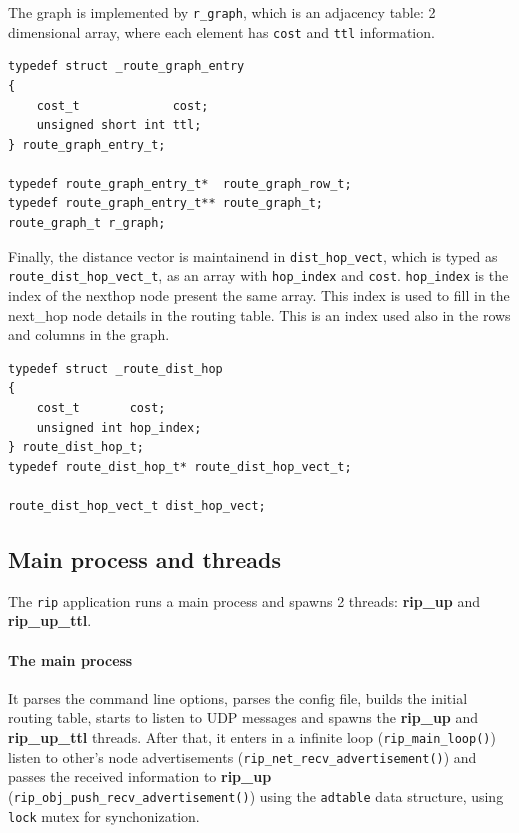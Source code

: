 \documentclass[10pt]{extarticle}
\begin{document}
\newpage
The graph is implemented by \texttt{r\_graph}, which is an adjacency table: 
2 dimensional array, where each element has \texttt{cost} and \texttt{ttl} information.

\begin{lstlisting}
typedef struct _route_graph_entry
{
    cost_t             cost;
    unsigned short int ttl;
} route_graph_entry_t;

typedef route_graph_entry_t*  route_graph_row_t;
typedef route_graph_entry_t** route_graph_t;
route_graph_t r_graph;
\end{lstlisting}

Finally, the  distance vector is maintainend  in \texttt{dist\_hop\_vect}, which
is   typed    as   \texttt{route\_dist\_hop\_vect\_t},   as   an    array   with
\texttt{hop\_index}  and \texttt{cost}.  \texttt{hop\_index} is  the index  of the
nexthop node present the same array. This  index is used to fill in the next\_hop
node details in  the routing table. This is  an index used also in  the rows and
columns in the graph.

\begin{lstlisting}
typedef struct _route_dist_hop
{
    cost_t       cost;
    unsigned int hop_index;
} route_dist_hop_t;
typedef route_dist_hop_t* route_dist_hop_vect_t;

route_dist_hop_vect_t dist_hop_vect;
\end{lstlisting}

\subsection{Main process and threads}

The \texttt{rip} application runs a main process and spawns 2 threads:
\textbf{rip\_up} and \textbf{rip\_up\_ttl}.

\paragraph{The main  process} It  parses the command  line options,  parses the
config file, builds the initial routing  table, starts to listen to UDP messages
and spawns the \textbf{rip\_up} and \textbf{rip\_up\_ttl} threads. After that, it enters
in  a   infinite  loop  (\texttt{rip\_main\_loop()})  listen   to  other's  node
advertisements   (\texttt{rip\_net\_recv\_advertisement()})   and   passes   the
received              information               to              \textbf{rip\_up}
(\texttt{rip\_obj\_push\_recv\_advertisement()}) using the \texttt{adtable} data
structure, using \texttt{lock} mutex for synchonization.
\end{document}
